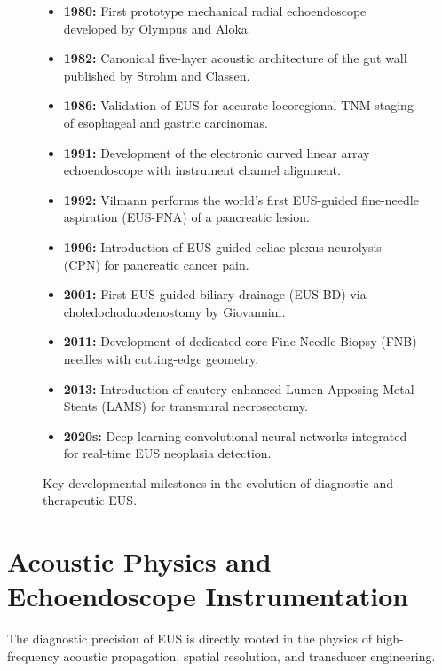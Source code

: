 \documentclass[11pt,a4paper]{article}
\begin{document}
\begin{figure}[htbp]
\centering
\begin{tcolorbox}[colback=teal!5!white,colframe=teal!60!black,title=\textbf{Chronological Milestones in the History of Endoscopic Ultrasound},width=\linewidth]
\small
\begin{itemize}[leftmargin=1.5em]
    \item \textbf{1980:} First prototype mechanical radial echoendoscope developed by Olympus and Aloka.
    \item \textbf{1982:} Canonical five-layer acoustic architecture of the gut wall published by Strohm and Classen.
    \item \textbf{1986:} Validation of EUS for accurate locoregional TNM staging of esophageal and gastric carcinomas.
    \item \textbf{1991:} Development of the electronic curved linear array echoendoscope with instrument channel alignment.
    \item \textbf{1992:} Vilmann performs the world's first EUS-guided fine-needle aspiration (EUS-FNA) of a pancreatic lesion.
    \item \textbf{1996:} Introduction of EUS-guided celiac plexus neurolysis (CPN) for pancreatic cancer pain.
    \item \textbf{2001:} First EUS-guided biliary drainage (EUS-BD) via choledochoduodenostomy by Giovannini.
    \item \textbf{2011:} Development of dedicated core Fine Needle Biopsy (FNB) needles with cutting-edge geometry.
    \item \textbf{2013:} Introduction of cautery-enhanced Lumen-Apposing Metal Stents (LAMS) for transmural necrosectomy.
    \item \textbf{2020s:} Deep learning convolutional neural networks integrated for real-time EUS neoplasia detection.
\end{itemize}
\end{tcolorbox}
\caption{Key developmental milestones in the evolution of diagnostic and therapeutic EUS.}
\label{fig:eus_milestones}
\end{figure}

\section{Acoustic Physics and Echoendoscope Instrumentation}
The diagnostic precision of EUS is directly rooted in the physics of high-frequency acoustic propagation, spatial resolution, and transducer engineering.
\end{document}
